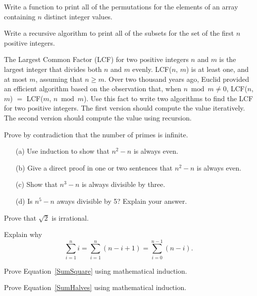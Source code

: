 \begin{exercises}
\item
Write a function to print all of the permutations for
the elements of an array containing \(n\) distinct integer
values.

\item
Write a recursive algorithm to print all of the subsets for the set
of the first \(n\) positive integers.

\item
The Largest Common Factor (LCF)
for two positive integers \(n\) and
\(m\) is the largest integer that divides both \(n\) and \(m\) evenly.
LCF(\(n\), \(m\)) is at least one, and at most \(m\), assuming that
\(n \geq m\).
Over two thousand years ago, Euclid provided an efficient algorithm
based on the observation that, when \(n \bmod m \neq 0\),
LCF(\(n\), \(m\)) $=$ LCF(\(m\), \(n \bmod m\)).
Use this fact to write two algorithms to find the LCF for two
positive integers.
The first version should compute the value iteratively.
The second version should compute the value using recursion.

\item
Prove by contradiction that the number
of primes is infinite.

\item
\begin{enumerate}
\item[(a)] Use induction to show that \(n^2 - n\) is always even.
\item[(b)] Give a direct proof in one or two sentences that
\(n^2 - n\) is always even.
\item[(c)] Show that \(n^3 - n\) is always divisible by three.
\item[(d)] Is \(n^5 - n\) aways divisible by 5? Explain your answer.
\end{enumerate}

\item
Prove that \(\sqrt{2}\) is irrational.

\item
Explain why
\[ \sum_{i=1}^n i = \sum_{i=1}^n (n - i + 1) =
   \sum_{i=0}^{n-1} (n - i).\] 

\item
Prove Equation~\ref{SumSquare} using mathematical
induction.

\item
Prove Equation~\ref{SumHalves} using mathematical
induction.


\end{exercises}
